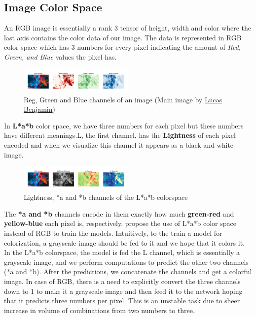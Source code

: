 \documentclass[conference]{IEEEtran}
\begin{document}
\subsection{Image Color Space}
\hspace*{0.25 in}An RGB image is essentially a rank 3 tensor of height, width and color where the last axis contains the color data of our image. The data is represented in RGB color space which has 3 numbers for every pixel indicating the amount of \textit{Red, Green, and Blue} values the pixel has.
\begin{figure}[!htb]
\begin{center}
	\includegraphics[width=0.5\textwidth]{figures/rgb_colorspace}
	\caption{Reg, Green and Blue channels of an image (Main image by \href{https://unsplash.com/@aznbokchoy}{Lucas Benjamin})}
	\label{rgb_colorspace}
\end{center}
\end{figure}
In \textbf{L*a*b} color space, we have three numbers for each pixel but these numbers have different meanings.L, the first channel, has the \textbf{Lightness} of each pixel encoded and when we visualize this channel it appears as a black and white image. 
\begin{figure}[!htb]
\begin{center}
	\includegraphics[width=0.5\textwidth]{figures/Lab_colorspace}
	\caption{Lightness, *a and *b channels of the L*a*b colorspace}
	\label{lab_colorspace}
\end{center}
\end{figure}
The \textbf{*a and *b} channels encode in them exactly how much \textbf{green-red} and \textbf{yellow-blue} each pixel is, respectively.
\cite{guadarrama2017pixcolor,isola2018imagetoimage} propose the use of L*a*b color space instead of RGB to train the models. Intuitively, to the train a model for colorization, a grayscale image should be fed to it and we hope that it colors it. In the L*a*b colorspace, the model is fed the L channel, which is essentially a grayscale image, and we perform computations to predict the other two channels (*a and *b). After the predictions, we concatenate the channels and get a colorful image. In case of RGB, there is a need to explicitly convert the three channels down to 1 to make it a grayscale image and then feed it to the network hoping that it predicts three numbers per pixel. This is an unstable task due to sheer increase in volume of combinations from two numbers to three.
\end{document}
